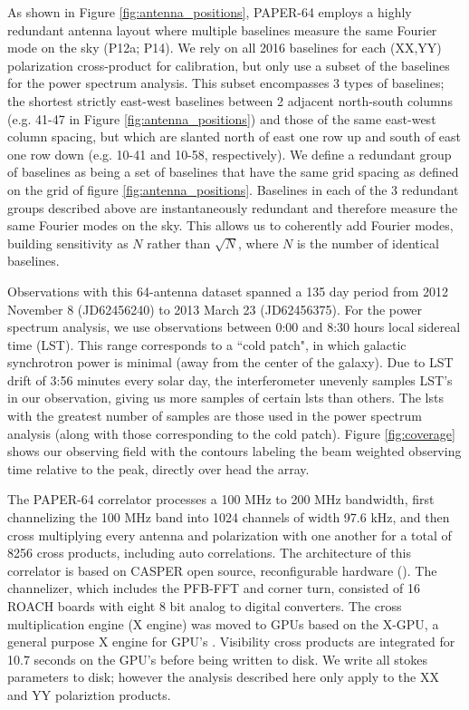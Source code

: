 \documentclass[twocolumn,numberedappendix]{emulateapj} \shorttitle{PSA64}
\begin{document}
As shown in Figure \ref{fig:antenna_positions}, PAPER-64 employs
a highly redundant antenna layout where multiple baselines measure
the same Fourier mode on the sky (P12a; P14).
We rely on all 2016 baselines for each (XX,YY) polarization cross-product for calibration,
but only use a subset of the baselines for the power spectrum
analysis. This subset encompasses 3 types of baselines; the shortest 
strictly east-west baselines between 2 adjacent north-south columns (e.g. 41-47
in Figure \ref{fig:antenna_positions}) and those of the same east-west column
spacing, but which are slanted north of east one row up and south of east one
row down (e.g. 10-41 and 10-58, respectively). We define a redundant group of
baselines as being a set of baselines that have the same grid spacing as
defined on the grid of figure \ref{fig:antenna_positions}.  Baselines in each
of the 3 redundant groups described above are instantaneously redundant and
therefore measure the same Fourier modes on the sky. This allows us to
coherently add Fourier modes, building sensitivity as $N$ rather than
$\sqrt{N}$, where $N$ is the number of identical baselines.  




Observations with this 64-antenna dataset spanned a 135 day period 
from 2012 November 8 (JD62456240) to 2013 March 23 (JD62456375). 
For the power spectrum analysis, we use observations between 0:00 and 8:30 hours
local sidereal time (LST). This range corresponds to
a ``cold patch", in which galactic synchrotron power is minimal (away from
the center of the galaxy). Due to LST drift of 3:56 minutes every solar day, the interferometer
unevenly samples LST's in our observation, giving us more samples of certain
lsts than others. 
The lsts with the greatest number of samples are those used in
the power spectrum analysis (along with those corresponding to the cold patch).
Figure \ref{fig:coverage} shows our observing field with the contours labeling
the beam weighted observing time relative to the peak, directly over head the
array.

The PAPER-64 correlator processes a 100 MHz to 200 MHz bandwidth, first
channelizing the 100 MHz band into 1024 channels of width 97.6 kHz, and then
cross multiplying every antenna and polarization with one another for a total of
8256 cross products, including auto correlations. The architecture of this
correlator is based on CASPER open source, reconfigurable hardware
(\cite{parsons_et_al2008}). The channelizer, which includes the PFB-FFT and
corner turn, consisted of 16 ROACH boards with eight 8 bit analog to digital
converters. The cross multiplication engine (X engine) was moved to GPUs based
on the X-GPU, a general purpose X engine for GPU's \citep{clark_et_al2013}. 
Visibility cross products are integrated for 10.7 seconds on the GPU's before
being written to disk. We write all stokes parameters to disk; however the
analysis described here only apply to the XX and YY polariztion products.
\end{document}
